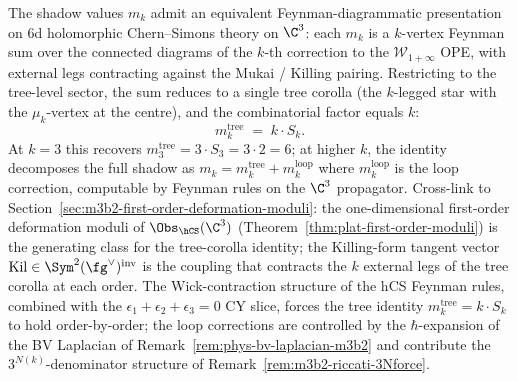 \begin{remark}[\texorpdfstring{$6$}{6}d hCS Feynman presentation: \texorpdfstring{$m_k = k \cdot S_k$}{m-k = k . S-k} from tree corollas]
\label{rem:m3b2-6d-hcs-feynman}
The shadow values $m_k$ admit an equivalent Feynman-diagrammatic
presentation on $6$d holomorphic Chern--Simons theory on $\C^3$: each
$m_k$ is a $k$-vertex Feynman sum over the connected diagrams of the
$k$-th correction to the $\mathcal{W}_{1+\infty}$ OPE, with external
legs contracting against the Mukai / Killing pairing. Restricting to
the tree-level sector, the sum reduces to a single tree corolla (the
$k$-legged star with the $\mu_k$-vertex at the centre), and the
combinatorial factor equals $k$:
\[
 m_k^{\mathrm{tree}} \;=\; k \cdot S_k.
\]
At $k = 3$ this recovers $m_3^{\mathrm{tree}} = 3 \cdot S_3 = 3 \cdot 2 = 6$;
at higher $k$, the identity decomposes the full shadow as
$m_k = m_k^{\mathrm{tree}} + m_k^{\mathrm{loop}}$ where
$m_k^{\mathrm{loop}}$ is the loop correction, computable by Feynman rules
on the $\C^3$ propagator. Cross-link to
Section~\ref{sec:m3b2-first-order-deformation-moduli}: the one-dimensional
first-order deformation moduli of $\Obs_{\hCS}(\C^3)$
(Theorem~\ref{thm:plat-first-order-moduli}) is the generating class
for the tree-corolla identity; the Killing-form tangent vector
$\mathrm{Kil} \in \Sym^2(\fg^\vee)^{\mathrm{inv}}$ is the coupling that
contracts the $k$ external legs of the tree corolla at each order. The
Wick-contraction structure of the hCS Feynman rules, combined with the
$\epsilon_1 + \epsilon_2 + \epsilon_3 = 0$ CY slice, forces the tree
identity $m_k^{\mathrm{tree}} = k \cdot S_k$ to hold order-by-order; the
loop corrections are controlled by the $\hbar$-expansion of the BV
Laplacian of Remark~\ref{rem:phys-bv-laplacian-m3b2} and contribute the
$3^{N(k)}$-denominator structure of
Remark~\ref{rem:m3b2-riccati-3Nforce}.
\end{remark}

